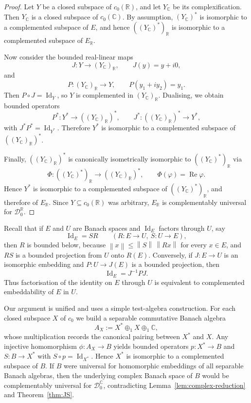 \documentclass[11pt]{amsart}
\newcommand{\C}{\mathbb{C}}
\newcommand{\R}{\mathbb{R}}
\newcommand{\norm}[1]{\left\lVert #1\right\rVert}
\newcommand{\id}{\operatorname{Id}}
\renewcommand{\le}{\leqslant}
\theoremstyle{plain}
\theoremstyle{remark}
\numberwithin{equation}{section}
\begin{document}
\begin{proof}
Let $Y$ be a closed subspace of $c_0(\R)$, and let $Y_{\C}$ be its complexification. Then $Y_{\C}$ is a closed subspace of $c_0(\C)$. By assumption, $(Y_{\C})^*$ is isomorphic to a complemented subspace of $E$, and hence $((Y_{\C})^*)_{\R}$ is isomorphic to a complemented subspace of $E_{\R}$.

Now consider the bounded real-linear maps
\[
J:Y\to (Y_{\C})_{\R},\qquad J(y)=y+i0,
\]
and
\[
P:(Y_{\C})_{\R}\to Y,\qquad P(y_1+iy_2)=y_1.
\]
Then $P\circ J=\id_Y$, so $Y$ is complemented in $(Y_{\C})_{\R}$. Dualising, we obtain bounded operators
\[
P^*:Y^*\to ((Y_{\C})_{\R})^*,\qquad J^*:((Y_{\C})_{\R})^*\to Y^*,
\]
with $J^*P^*=\id_{Y^*}$. Therefore $Y^*$ is isomorphic to a complemented subspace of $((Y_{\C})_{\R})^*$.

Finally, $((Y_{\C})_{\R})^*$ is canonically isometrically isomorphic to $((Y_{\C})^*)_{\R}$ via
\[
\Phi:((Y_{\C})^*)_{\R}\to ((Y_{\C})_{\R})^*,\qquad \Phi(\varphi)=\operatorname{Re}\varphi.
\]
Hence $Y^*$ is isomorphic to a complemented subspace of $((Y_{\C})^*)_{\R}$, and therefore of $E_{\R}$. Since $Y\subseteq c_0(\R)$ was arbitrary, $E_{\R}$ is complementably universal for $\mathcal D_0^{\R}$.
\end{proof}

Recall that if $E$ and $U$ are Banach spaces and $\id_E$ factors through $U$, say
\[
\id_E = SR \qquad (R:E\to U,\ S:U\to E),
\]
then $R$ is bounded below, because $\norm{x}\le \norm{S}\,\norm{Rx}$ for every $x\in E$, and $RS$ is a bounded projection from $U$ onto $R(E)$. Conversely, if $J:E\to U$ is an isomorphic embedding and $P:U\to J(E)$ is a bounded projection, then
\[
\id_E = J^{-1}PJ.
\]
Thus factorisation of the identity on $E$ through $U$ is equivalent to complemented embeddability of $E$ in $U$.

Our argument is unified and uses a simple test-algebra construction. For each closed subspace $X$ of $c_0$ we build a separable commutative Banach algebra
\[
A_X := X^* \oplus_1 X \oplus_1 \C,
\]
whose multiplication records the canonical pairing between $X^*$ and $X$. Any injective homomorphism $\phi:A_X\to B$ yields bounded operators $p:X^*\to B$ and $S:B\to X^*$ with $S\circ p = \id_{X^*}$. Hence $X^*$ is isomorphic to a complemented subspace of $B$. If $B$ were universal for homomorphic embeddings of all separable Banach algebras, then the underlying complex Banach space of $B$ would be complementably universal for $\mathcal D_0^{\C}$, contradicting Lemma~\ref{lem:complex-reduction} and Theorem~\ref{thm:JS}.
\end{document}
